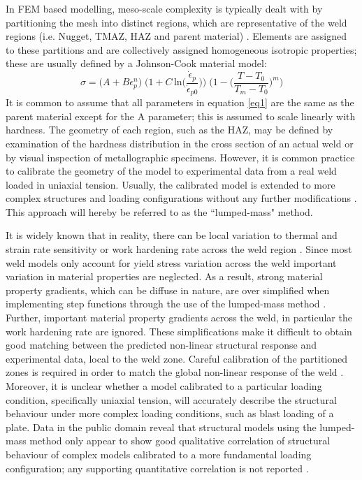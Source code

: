 In FEM based modelling, meso-scale complexity is typically dealt with by partitioning the mesh into distinct regions, which are representative of the weld regions (i.e. Nugget, TMAZ, HAZ and parent material) \cite{McWilliams2013,Grujicic2011}. Elements are assigned to these partitions and are collectively assigned homogeneous isotropic properties; these are usually defined by a Johnson-Cook material model:
\begin{equation}
\label{eq1}
\sigma = \bigg( A + B\epsilon^n_{p} \bigg)\; \bigg(1 +C\,\text{ln}\bigg(\frac{\dot{\epsilon}_{p}}{\dot{\epsilon}_{p0}}\bigg)\bigg)\; \bigg(1-\bigg(\frac{T-T_0}{T_m-T_0}\bigg)^m\bigg)
\end{equation}
It is common to assume that all parameters in equation \ref{eq1} are the same as the parent material except for the A parameter; this is assumed to scale linearly with hardness. The geometry of each region, such as the HAZ, may be defined by examination of the hardness distribution in the cross section of an actual weld or by visual inspection of metallographic specimens. However, it is common practice to calibrate the geometry of the model to experimental data from a real weld loaded in uniaxial tension. Usually, the calibrated model is extended to more complex structures and loading configurations without any further modifications \cite{McWilliams2013,Grujicic2011a}. This approach will hereby be referred to as the ``lumped-mass" method. 

It is widely known that in reality, there can be local variation to thermal and strain rate sensitivity or work hardening rate across the weld region \cite{Grujicic2011a,Genevois2006}. Since most weld models only account for yield stress variation across the weld important variation in material properties are neglected.
As a result, strong material property gradients, which can be diffuse in nature, are over simplified when implementing step functions through the use of the lumped-mass method \cite{McWilliams2013,Grujicic2011a}. Further, important material property gradients across the weld, in particular the work hardening rate are ignored. These simplifications make it difficult to obtain good matching between the predicted non-linear structural response and experimental data, local to the weld zone. Careful calibration of the partitioned zones is required in order to match the global non-linear response of the weld \cite{McWilliams2013,Grujicic2011a}. Moreover, it is unclear whether a model calibrated to a particular loading condition, specifically uniaxial tension, will accurately describe the structural behaviour under more complex loading conditions, such as blast loading of a plate. Data in the public domain reveal that structural models using the lumped-mass method only appear to show good qualitative correlation of structural behaviour of complex models calibrated to a more fundamental loading configuration; any supporting quantitative correlation is not reported \cite{McWilliams2013,Grujicic2011a}. 

